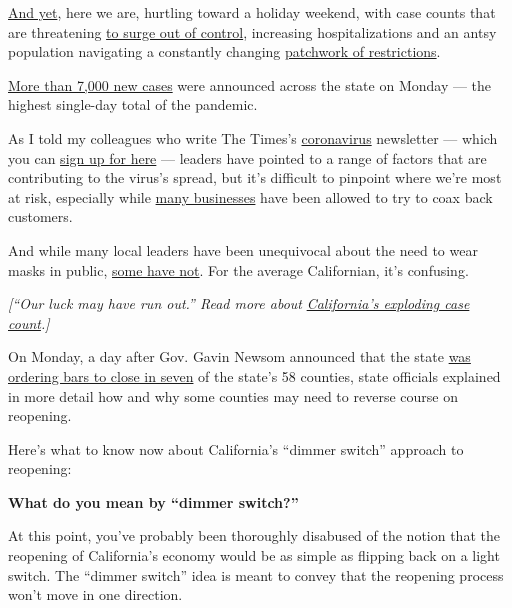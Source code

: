 \href{https://www.nytimes.com/2020/06/29/us/coronavirus-today.html}{And
yet}, here we are, hurtling toward a holiday weekend, with case counts
that are threatening
\href{https://www.nytimes.com/2020/06/29/us/california-coronavirus-reopening.html?smtyp=cur\&smid=tw-nytnational}{to
surge out of control}, increasing hospitalizations and an antsy
population navigating a constantly changing
\href{https://www.nytimes.com/article/coronavirus-california-reopening-phases.html}{patchwork
of restrictions}.

\href{https://www.nytimes.com/2020/06/29/us/california-coronavirus-reopening.html?}{More
than 7,000 new cases} were announced across the state on Monday --- the
highest single-day total of the pandemic.

As I told my colleagues who write The Times's
\href{https://www.nytimes.com/2020/07/14/us/california-counties-reopening.html}{coronavirus}
newsletter --- which you can
\href{https://www.nytimes.com/newsletters/coronavirus-briefing}{sign up
for here} --- leaders have pointed to a range of factors that are
contributing to the virus's spread, but it's difficult to pinpoint where
we're most at risk, especially while
\href{https://www.nytimes.com/2020/06/25/us/coronavirus-oakland-reopening-bar.html?}{many
businesses} have been allowed to try to coax back customers.

And while many local leaders have been unequivocal about the need to
wear masks in public,
\href{https://www.cbsnews.com/news/california-budget-crisis-gavin-newsom-face-mask-threaten-funds/}{some
have not}. For the average Californian, it's confusing.

\emph{{[}``Our luck may have run out.'' Read more about}
\href{https://www.nytimes.com/2020/06/29/us/california-coronavirus-reopening.html?smtyp=cur\&smid=tw-nytnational}{\emph{California's
exploding case count}}\emph{.{]}}

On Monday, a day after Gov. Gavin Newsom announced that the state
\href{https://www.cdph.ca.gov/Programs/CID/DCDC/Pages/COVID-19/Bar-Closure-Guidance.aspx}{was
ordering bars to close in seven} of the state's 58 counties, state
officials explained in more detail how and why some counties may need to
reverse course on reopening.

Here's what to know now about California's ``dimmer switch'' approach to
reopening:

\textbf{What do you mean by ``dimmer switch?''}

At this point, you've probably been thoroughly disabused of the notion
that the reopening of California's economy would be as simple as
flipping back on a light switch. The ``dimmer switch'' idea is meant to
convey that the reopening process won't move in one direction.

